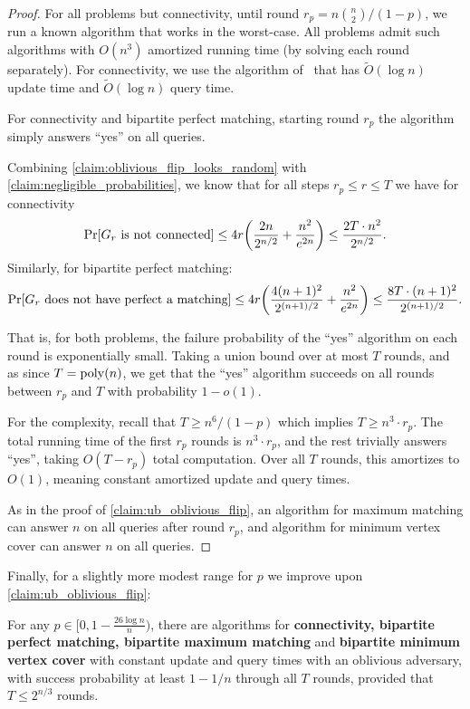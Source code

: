 \documentclass[letter,11pt]{article}
\begin{document}
\begin{proof}
    For all problems but connectivity, until round $r_p = n\binom{n}{2}/(1-p)$, we run a known algorithm that works in the worst-case. All problems admit such algorithms with $O(n^3)$ amortized running time (by solving each round separately). 
    For connectivity, 
    we use the algorithm of~\cite{HuangHKPT23} that has $\tilde O(\log n)$ update time and $\tilde O(\log n)$ query time.

    For connectivity and bipartite perfect matching, starting round $r_p$ the algorithm simply answers ``yes'' on all queries.
    
    Combining \cref{claim:oblivious_flip_looks_random} with \cref{claim:negligible_probabilities}, we know that for all steps $r_p \leq r \leq T$ we have for connectivity
    \[
        \Prob{}{G_r \textnormal{ is not connected}}
        \leq 4r\left( \frac{2n}{2^{n/2}} + \frac{n^2}{e^{2n}}\right)
        \leq \frac{2T \cdot n^2}{2^{n/2}} .
    \]
    Similarly, for bipartite perfect matching:
    \[
        \Prob{}{G_r \textnormal{ does not have perfect a matching}}
        \leq 4r\left( \frac{4(n+1)^2}{2^{(n+1)/2}} + \frac{n^2}{e^{2n}}\right)
        \leq \frac{8T \cdot (n+1)^2}{{2^{(n+1)/2}}} .
    \]
	
	That is, for both problems, the failure probability of the ``yes'' algorithm on each round is exponentially small. Taking a union bound over at most $T$ rounds, and as since $T = \operatorname{poly}(n)$, 
	we get that the ``yes'' algorithm succeeds on all rounds between $r_p$ and $T$ with probability $1 - o(1)$.
    
    For the complexity, recall that $T \geq n^6/(1-p)$ which implies $T \geq n^3 \cdot r_p$.
    The total running time of the first $r_p$ rounds is $n^3 \cdot r_p$, and the rest trivially answers ``yes'', taking $O(T - r_p)$ total computation. Over all $T$ rounds, this amortizes to $O(1)$, meaning constant amortized update and query times.
    
    As in the proof of \cref{claim:ub_oblivious_flip}, an algorithm for maximum matching can answer $n$ on all queries after round $r_p$,
    and algorithm for minimum vertex cover can answer $n$ on all queries.
\end{proof}


Finally, for a slightly more modest range for $p$ we improve upon \cref{claim:ub_oblivious_flip}:
\begin{lemma}
\label{lem:ub_oblivious_flip}
    For any $p\in[0,1-\frac{26\log n}{n})$, 
    there are algorithms for 
    \textbf{connectivity, bipartite perfect matching, bipartite maximum matching} and \textbf{bipartite minimum vertex cover}
    with constant update and query times with an oblivious adversary, with success probability at least $1-1/n$ through all $T$ rounds, provided that $T \leq 2^{n/3}$ rounds.
\end{lemma}
\end{document}
